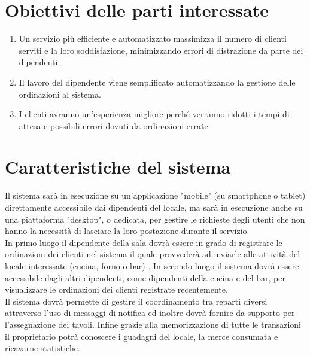 \section{Obiettivi delle parti interessate}
\begin{enumerate}
    \item Un servizio più efficiente e automatizzato massimizza il numero di clienti serviti e la loro soddisfazione, minimizzando errori di distrazione da parte dei dipendenti.
    \item Il lavoro del dipendente viene semplificato automatizzando la gestione delle ordinazioni al sistema.
    \item I clienti avranno un’esperienza migliore perché verranno ridotti i tempi di attesa e possibili errori dovuti da ordinazioni errate. 
\end{enumerate}

\section{Caratteristiche del sistema}

Il sistema sarà in esecuzione su un’applicazione "mobile" (su smartphone o tablet) direttamente accessibile dai dipendenti del locale, ma sarà in esecuzione anche su una piattaforma "desktop", o dedicata, per gestire le richieste degli utenti che non hanno la necessità di lasciare la loro postazione durante il servizio. \\
In primo luogo il dipendente della sala dovrà essere in grado di registrare le ordinazioni dei clienti nel sistema il quale provvederà ad inviarle alle attività del locale interessate (cucina, forno o bar) . In secondo luogo il sistema dovrà essere accessibile dagli altri dipendenti, come dipendenti della cucina e del bar, per visualizzare le ordinazioni dei clienti registrate recentemente. \\Il sistema dovrà permette di gestire il coordinamento tra reparti diversi attraverso l'uso di messaggi di notifica ed inoltre dovrà fornire da supporto per l’assegnazione dei tavoli.
Infine grazie alla memorizzazione di tutte le transazioni il proprietario potrà conoscere i guadagni del locale, la merce consumata e ricavarne statistiche.


